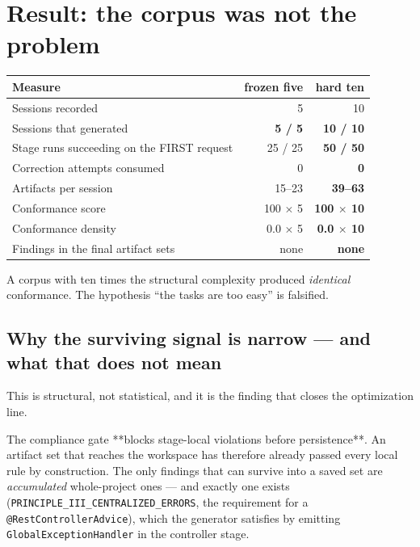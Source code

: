 \documentclass[11pt,a4paper]{article}
\begin{document}
\section{Result: the corpus was not the problem}

\begin{center}
\begin{tabular}{@{}lrr@{}}
\toprule
\textbf{Measure} & \textbf{frozen five} & \textbf{hard ten} \\
\midrule
Sessions recorded & 5 & 10 \\
Sessions that generated & \textbf{5 / 5} & \textbf{10 / 10} \\
Stage runs succeeding on the FIRST request & 25 / 25 & \textbf{50 / 50} \\
Correction attempts consumed & 0 & \textbf{0} \\
Artifacts per session & 15--23 & \textbf{39--63} \\
Conformance score & 100 $\times$ 5 & \textbf{100 $\times$ 10} \\
Conformance density & 0.0 $\times$ 5 & \textbf{0.0 $\times$ 10} \\
Findings in the final artifact sets & none & \textbf{none} \\
\bottomrule
\end{tabular}
\end{center}

A corpus with ten times the structural complexity produced \emph{identical}
conformance. The hypothesis ``the tasks are too easy'' is falsified.

\subsection{Why the surviving signal is narrow --- and what that does not mean}
\label{sec:structural}

This is structural, not statistical, and it is the finding that closes the
optimization line.

The compliance gate **blocks stage-local violations before persistence**. An artifact
set that reaches the workspace has therefore already passed every local rule by
construction. The only findings that can survive into a saved set are
\emph{accumulated} whole-project ones --- and exactly one exists
(\texttt{PRINCIPLE\_III\_CENTRALIZED\_ERRORS}, the requirement for a
\texttt{@RestControllerAdvice}), which the generator satisfies by emitting
\texttt{GlobalExceptionHandler} in the controller stage.
\end{document}
